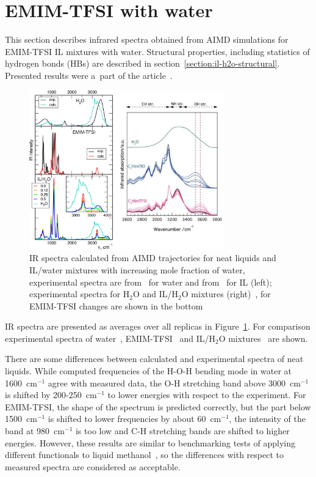 \section{EMIM-TFSI with water}
\label{section:il-h2o-ir}

This section describes infrared spectra obtained from AIMD simulations for EMIM-TFSI IL mixtures with water. Structural properties, including statistics of hydrogen bonds (HBs) are described in section~\ref{section:il-h2o-structural}. Presented results were a~part of the article~\cite{il-h2o}.

\begin{figure}[ht]
    \centering
    \includegraphics[width=0.75\textwidth]{img/4-ir-spectra-from-aimd-simulations/4-il-h2o/ir-spectra.png}
    \caption{IR spectra calculated from AIMD trajectories for neat liquids and IL/water mixtures with increasing mole fraction of water, experimental spectra are from~\cite{experimental-ir-h2o} for water and from~\cite{experimental-ir-emim-tfsi} for IL (left); experimental spectra for H$_2$O and IL/H$_2$O mixtures (right)~\cite{experimental-ir-emim-tfsi-h2o}, for EMIM-TFSI changes are shown in the bottom}
    \label{fig:il-h2o-ir-spectra}
\end{figure}

IR spectra are presented as averages over all replicas in Figure~\ref{fig:il-h2o-ir-spectra}. For comparison experimental spectra of water~\cite{experimental-ir-h2o}, EMIM-TFSI~\cite{experimental-ir-emim-tfsi} and IL/H$_2$O mixtures~\cite{experimental-ir-emim-tfsi-h2o} are shown.

There are some differences between calculated and experimental spectra of neat liquids. While computed frequencies of the H-O-H bending mode in water at 1600~cm$^{-1}$ agree with measured data, the O-H stretching band above 3000~cm$^{-1}$ is shifted by 200-250~cm$^{-1}$ to lower energies with respect to the experiment. For EMIM-TFSI, the shape of the spectrum is predicted correctly, but the part below 1500~cm$^{-1}$ is shifted to lower frequencies by about 60~cm$^{-1}$, the intensity of the band at 980~cm$^{-1}$ is too low and C-H stretching bands are shifted to higher energies. However, these results are similar to benchmarking tests of applying different functionals to liquid methanol~\cite{dft-methanol-benchmark}, so the differences with respect to measured spectra are considered as acceptable.

